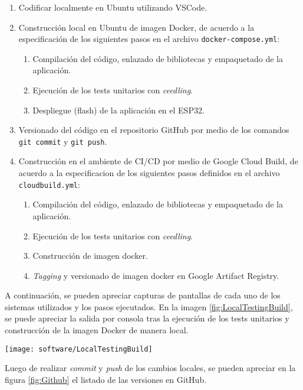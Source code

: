\begin{enumerate}
	\item Codificar localmente en Ubuntu utilizando VSCode.
	\item Construcción local en Ubuntu de imagen Docker, de acuerdo a la especificación de los siguientes pasos en el archivo \verb|docker-compose.yml|:
	\begin{enumerate}
		\item Compilación del código, enlazado de bibliotecas y empaquetado de la aplicación.
		\item Ejecución de los tests unitarios con \textit{ceedling}.
		\item Despliegue (flash) de la aplicación en el ESP32.
	\end{enumerate}
	\item Versionado del código en el repositorio GitHub por medio de los comandos \verb|git commit| y \verb|git push|.
	\item Construcción en el ambiente de CI/CD por medio de Google Cloud Build, de acuerdo a la especificacion de los siguientes pasos definidos en el archivo \verb|cloudbuild.yml|:
	\begin{enumerate}
		\item Compilación del código, enlazado de bibliotecas y empaquetado de la aplicación.
		\item Ejecución de los tests unitarios con \textit{ceedling}.
		\item Construcción de imagen docker.
		\item \textit{Tagging} y versionado de imagen docker en Google Artifact Registry.
	\end{enumerate}
\end{enumerate}


A continuación, se pueden apreciar capturas de pantallas de cada uno de los sistemas utilizados y los pasos ejecutados. En la imagen \ref{fig:LocalTestingBuild}, se puede apreciar la salida por consola tras la ejecución de los tests unitarios y construcción de la imagen Docker de manera local. 

\begin{center}
   \texttt{[image: software/LocalTestingBuild]}
   \label{fig:LocalTestingBuild}
\end{center}


Luego de realizar \textit{commit} y \textit{push} de los cambios locales, se pueden apreciar en la figura \ref{fig:Github} el listado de las versiones en GitHub.


